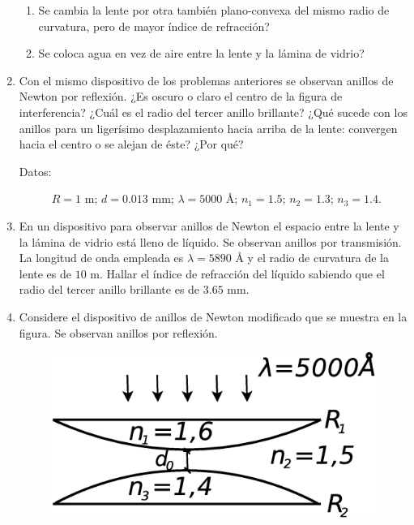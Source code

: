 \documentclass[11pt,spanish]{article}
\begin{document}
\begin{enumerate}
    \begin{enumerate}
        \item Se cambia la lente por otra también plano-convexa del mismo radio
        de curvatura, pero de mayor índice de refracción?

        \item Se coloca agua en vez de aire entre la lente y la lámina de vidrio?
    \end{enumerate}
    

    \item Con el mismo dispositivo de los problemas anteriores se observan anillos
    de Newton por reflexión. ¿Es oscuro o claro el centro de la figura
    de interferencia? ¿Cuál es el radio del tercer anillo brillante? ¿Qué
    sucede con los anillos para un ligerísimo desplazamiento hacia arriba
    de la lente: convergen hacia el centro o se alejan de éste? ¿Por qué?

    \begin{description}
        \item [{Datos:}] $R=1$ m; $d=0.013$ mm; $\lambda=5000$ Å; $n_{1}=1.5$;
        $n_{2}=1.3$; $n_{3}=1.4$.
    \end{description}
 
   
    \item En un dispositivo para observar anillos de Newton el espacio entre
    la lente y la lámina de vidrio está lleno de líquido. Se observan
    anillos por transmisión. La longitud de onda empleada es $\lambda=5890$
    Å y el radio de curvatura de la lente es de $10$ m. Hallar el índice
    de refracción del líquido sabiendo que el radio del tercer anillo
    brillante es de $3.65$ mm. 


    \item Considere el dispositivo de anillos de Newton modificado que se muestra
    en la figura. Se observan anillos por reflexión. 

    \begin{figure}[H]
        \centering{}
        \includegraphics[clip,scale=0.25]{figs/ej5-30}
    \end{figure}


\end{enumerate}
\end{document}
